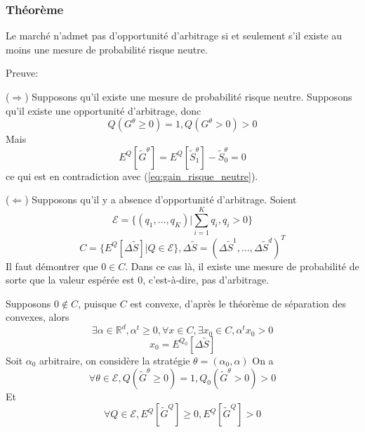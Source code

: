 \documentclass{article}
\theoremstyle{plain}
\theoremstyle{definition}
\begin{document}
\subsubsection{Th\'eor\`eme}
Le march\'e n'admet pas d'opportunit\'e d'arbitrage si et seulement s'il existe au moins une mesure de probabilit\'e risque neutre.

Preuve:

($\Rightarrow$) Supposons qu'il existe une mesure de probabilit\'e risque neutre. Supposons qu'il existe une opportunit\'e d'arbitrage, donc 
\begin{equation}
\label{eq:gain_risque_neutre}
Q(G^\theta\geq0)=1, Q(G^\theta>0)>0
\end{equation}
Mais
\begin{equation}
E^Q[\tilde{G}^\theta]=E^Q[\tilde{S}_1^\theta]-\tilde{S}_0^\theta=0
\end{equation}
ce qui est en contradiction avec (\ref{eq:gain_risque_neutre}).

($\Leftarrow$) Supposons qu'il y a absence d'opportunit\'e d'arbitrage. Soient
\begin{equation}
\mathcal{E}=\{(q_1,\ldots,q_K)|\sum_{i=1}^K q_i, q_i>0\}
\end{equation}
\begin{equation}
C=\{E^Q[\Delta\tilde{S}]|Q\in\mathcal{E}\}, \Delta \tilde{S}=(\Delta \tilde{S}^1,\ldots, \Delta\tilde{S}^d)^T
\end{equation}
Il faut d\'emontrer que $0\in C$. Dans ce cas l\`a, il existe une mesure de probabilit\'e de sorte que la valeur esp\'er\'ee est $0$, c'est-\`a-dire, pas d'arbitrage. 

Supposons $0\notin C$, puisque $C$ est convexe, d'apr\`es le th\'eor\`eme de s\'eparation des convexes, alors 
\begin{equation}
\exists \alpha \in \mathbb{R}^d, \alpha^t \geq 0, \forall x\in C,\exists x_0\in C, \alpha^t x_0 > 0
\end{equation}
\begin{equation}
x_0=E^{Q_0}[\Delta\tilde{S}]
\end{equation}
Soit $\alpha_0$ arbitraire, on consid\`ere la strat\'egie $\theta=(\alpha_0, \alpha)$
On a
\begin{equation}
	\forall \theta\in\mathcal{E}, Q(\tilde{G}^\theta\geq 0)=1, Q_0(\tilde{G}^\theta>0)>0
\end{equation}
Et
\begin{equation}
	\forall Q\in\mathcal{E}, E^Q[\tilde{G}^Q]\geq 0, E^Q[\tilde{G}^Q]>0
\end{equation}
\end{document}
